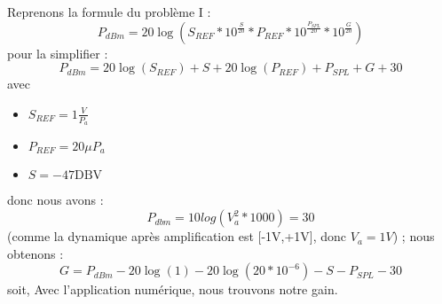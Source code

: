 Reprenons la formule du problème I :
\begin{equation}
    P_{dBm} = 20\log(S_{REF}*10^\frac{S}{20}*P_{REF}*10^\frac{P_{SPL}}{20}*10^\frac{G}{20})
\end{equation}
pour la simplifier : 
\begin{equation}
    P_{dBm} = 20\log(S_{REF}) + S + 20\log(P_{REF}) + P_{SPL} + G + 30
\end{equation}
avec 
\begin{itemize}
    \item $S_{REF} = 1\frac{V}{P_a}$
    \item $P_{REF} = 20\mu P_a$
    \item $S = -47 \text{DBV}$
\end{itemize}
donc nous avons :
\begin{equation}
    P_{dbm} = 10log(V_a^2 * 1000) = 30
\end{equation}
(comme la dynamique après amplification est [-1V,+1V], donc $V_a = 1V$)
; nous obtenons :
\begin{equation}
    G = P_{dBm} - 20\log(1) - 20\log(20*10^{-6}) - S - P_{SPL} - 30 
\end{equation}
soit,
Avec l'application numérique, nous trouvons notre gain.
